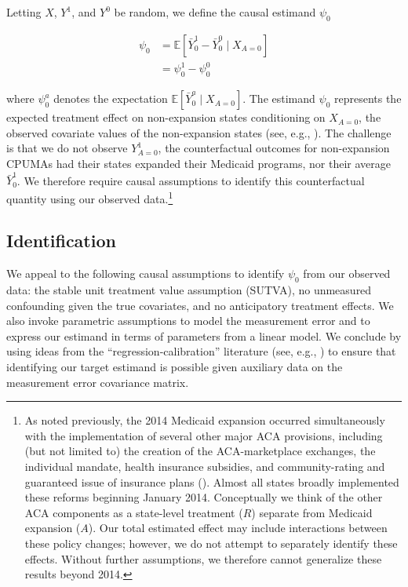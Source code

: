 \documentclass[aoas]{imsart}
\theoremstyle{plain}
\theoremstyle{remark}
\begin{document}
Letting $X$, $Y^1$, and $Y^0$ be random, we define the causal estimand $\psi_0$

\begin{align} \label{eqn:psi}
    \psi_0&= \mathbb{E}[\bar{Y}_0^1 - \bar{Y}_0^0 \mid X_{A=0}] \\ 
    &= \psi_0^1 - \psi_0^0
\end{align}

where $\psi_0^a$ denotes the expectation $\mathbb{E}[\bar{Y}_0^a \mid X_{A=0}]$. The estimand $\psi_0$ represents the expected treatment effect on non-expansion states conditioning on $X_{A=0}$, the observed covariate values of the non-expansion states (see, e.g., \cite{imbens2004nonparametric}). The challenge is that we do not observe $Y^1_{A=0}$, the counterfactual outcomes for non-expansion CPUMAs had their states expanded their Medicaid programs, nor their average $\bar{Y}^1_0$. We therefore require causal assumptions to identify this counterfactual quantity using our observed data.\footnote{As noted previously, the 2014 Medicaid expansion occurred simultaneously with the implementation of several other major ACA provisions, including (but not limited to) the creation of the ACA-marketplace exchanges, the individual mandate, health insurance subsidies, and community-rating and guaranteed issue of insurance plans (\cite{courtemanche2017early}). Almost all states broadly implemented these reforms beginning January 2014. Conceptually we think of the other ACA components as a state-level treatment ($R$) separate from Medicaid expansion ($A$). Our total estimated effect may include interactions between these policy changes; however, we do not attempt to separately identify these effects. Without further assumptions, we therefore cannot generalize these results beyond 2014.} 

\subsection{Identification} \label{ssec:identification}

We appeal to the following causal assumptions to identify $\psi_0$ from our observed data: the stable unit treatment value assumption (SUTVA), no unmeasured confounding given the true covariates, and no anticipatory treatment effects. We also invoke parametric assumptions to model the measurement error and to express our estimand in terms of parameters from a linear model. We conclude by using ideas from the ``regression-calibration'' literature (see, e.g., \cite{gleser1992importance}) to ensure that identifying our target estimand is possible given auxiliary data on the measurement error covariance matrix.
\end{document}
